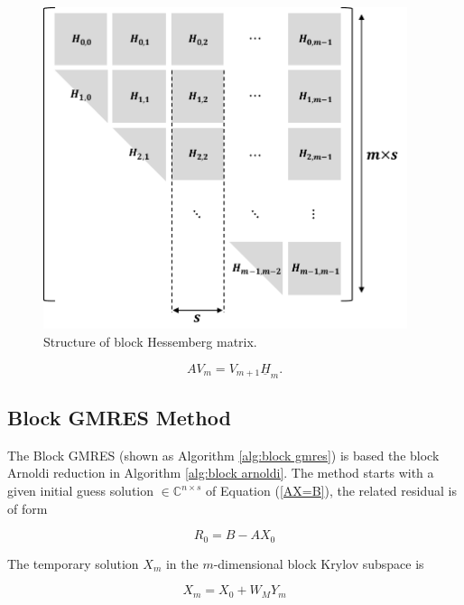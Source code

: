 \begin{figure}[htbp]
	\centering
	\includegraphics[width=4.2in]{fig/block-hessemberg.pdf}
	\caption{Structure of block Hessemberg matrix.}
	\label{fig:block-hessemberg}
\end{figure}

\begin{equation}
	AV_m=V_{m+1}\underline{H}_m.
\end{equation}
\subsection{Block GMRES Method}

The Block GMRES (shown as Algorithm \ref{alg:block gmres}) is based the block Arnoldi reduction in Algorithm \ref{alg:block arnoldi}. The method starts with a given initial guess solution $\in \mathbb{C}^{n\times s}$ of Equation (\ref{AX=B}), the related residual is of form

\begin{equation}
	R_0=B-AX_0
\end{equation}

The temporary solution $X_m$ in the $m$-dimensional block Krylov subspace is

\begin{equation}
	X_m = X_0+W_MY_m
\end{equation}

